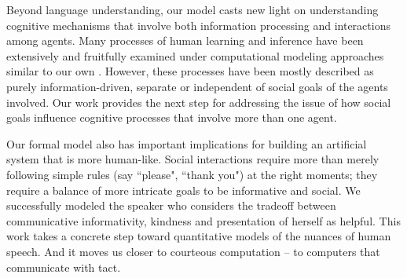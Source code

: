 \documentclass[12pt]{article}
\newcommand{\ejy}[1]{\textcolor{Red}{[ejy: #1]}}
\begin{document}
Beyond language understanding, our model casts new light on understanding cognitive mechanisms 
that involve both information processing and interactions among agents. 
Many processes of human learning and inference
have been extensively and fruitfully examined under computational modeling approaches similar to our own
\cite{tenenbaum2011, xu2007, bonawitz2011, baker2009}. 
However, these processes have been mostly described as purely information-driven, 
separate or independent of social goals of the agents involved.
Our work provides the next step for addressing the issue of 
how social goals influence cognitive processes that involve more than one agent. 

Our formal model also has important implications for building an artificial system that is more human-like. 
Social interactions require more than merely following simple rules (say ``please", ``thank you") at the right moments; 
they require a balance of more intricate goals to be informative and social. 
We successfully modeled the speaker who considers the tradeoff between 
communicative informativity, kindness and presentation of herself as helpful. 
This work takes a concrete step toward quantitative models of the nuances of human speech. 
And it moves us closer to courteous computation -- to computers that communicate with tact.



\end{document}
